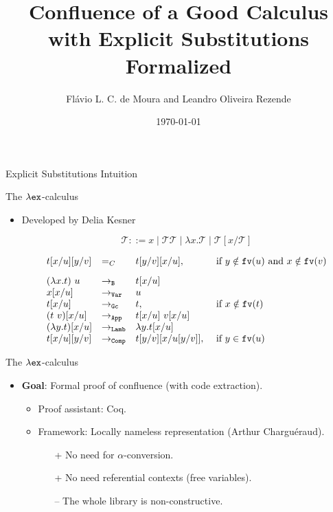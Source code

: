 \documentclass[10pt]{beamer}
\title{Confluence of a Good Calculus with Explicit Substitutions Formalized}
\date{\today}
\author{Flávio L. C. de Moura and Leandro Oliveira Rezende}
\institute{Universidade de Brasília}
\newcommand{\term}{{\mathcal{T}}}
\newcommand{\fv}[1]{{\tt fv}(#1)}
\begin{document}
\maketitle

\begin{frame}[fragile]{Explicit Substitutions}
  Intuition
\end{frame}

\begin{frame}[fragile]{The $\lambda{\tt ex}$-calculus}
\begin{itemize}
\item Developed by Delia Kesner \cite{kes09}

  $$\term ::= x \mid \term\term \mid \lambda x.\term \mid \term[x/\term]$$

  $$\begin{array}{llll}
      t[x/u][y/v] & =_C & t[y/v][x/u], & \mbox{ if } y \notin\fv{u} \mbox{ and } x \notin \fv{v} \\[.3cm]
      (\lambda x. t)\ u & \to_{\tt B} & t[x/u] & \\      
      x[x/u] & \to_{\tt Var} & u & \\      
      t[x/u] & \to_{\tt Gc} & t, & \mbox{ if } x \notin\fv{t} \\      
      (t\ v)[x/u] & \to_{\tt App} & t[x/u]\ v[x/u] & \\
      (\lambda y. t)[x/u] & \to_{\tt Lamb} & \lambda y.t[x/u] & \\
      t[x/u][y/v] & \to_{\tt Comp} & t[y/v][x/u[y/v]], & \mbox{ if } y \in\fv{u} \\            
      \end{array}$$
\end{itemize}
\end{frame}

\begin{frame}[fragile]{The $\lambda{\tt ex}$-calculus}
  \begin{itemize}
  \item {\bf Goal}: Formal proof of confluence (with code extraction).
    \begin{itemize}
    \item Proof assistant: Coq.
    \item Framework: Locally nameless representation (Arthur Charguéraud).
      \begin{itemize}
      \item[{\color{blue}+}] No need for $\alpha$-conversion.
      \item[{\color{blue}+}] No need referential contexts (free variables).
      \item[{\color{red}--}] The whole library is non-constructive.
      \end{itemize}
    \end{itemize}
  \end{itemize}
\end{frame}
\end{document}
